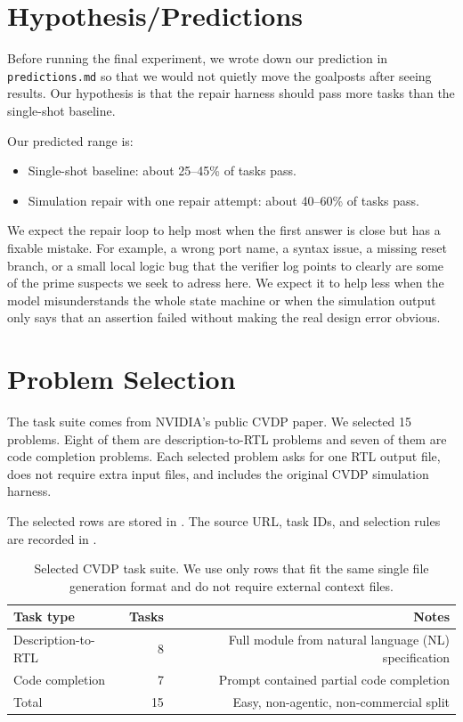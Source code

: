 \documentclass{article}
\begin{document}
\section{Hypothesis/Predictions}

Before running the final experiment, we wrote down our prediction in \texttt{predictions.md} so that we would not quietly move the goalposts after seeing results. Our hypothesis is that the repair harness should pass more tasks than the single-shot baseline.

Our predicted range is:

\begin{itemize}
    \item Single-shot baseline: about 25--45\% of tasks pass.
    \item Simulation repair with one repair attempt: about 40--60\% of tasks pass.
\end{itemize}

We expect the repair loop to help most when the first answer is close but has a fixable mistake. For example, a wrong port name, a syntax issue, a missing reset branch, or a small local logic bug that the verifier log points to clearly are some of the prime suspects we seek to adress here. We expect it to help less when the model misunderstands the whole state machine or when the simulation output only says that an assertion failed without making the real design error obvious.

\section{Problem Selection}

The task suite comes from NVIDIA's public CVDP paper. We selected 15 problems. Eight of them are description-to-RTL problems and seven of them are code completion problems. Each selected problem asks for one RTL output file, does not require extra input files, and includes the original CVDP simulation harness. 

The selected rows are stored in
.
The source URL, task IDs, and selection rules are recorded in
.

\begin{table}[h]
\centering
\begin{tabular}{lrr}
\toprule
Task type & Tasks & Notes \\
\midrule
Description-to-RTL & 8 & Full module from natural language (NL) specification \\
Code completion & 7 & Prompt contained partial code completion \\
\midrule
Total & 15 & Easy, non-agentic, non-commercial split \\
\bottomrule
\end{tabular}
\caption{Selected CVDP task suite. We use only rows that fit the same single file generation format and do not require external context files.}
\label{tab:tasks}
\end{table}
\end{document}
